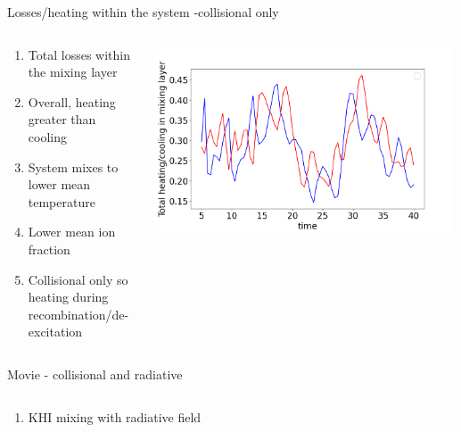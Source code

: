 \documentclass[10pt,aspectratio=169,usenames,dvipsnames]{beamer}
\begin{document}
\begin{frame}{Losses/heating within the system -collisional only}
\begin{columns}
\begin{column}{0.5\textwidth}
\begin{enumerate}
\item Total losses within the mixing layer
\item Overall, heating greater than cooling
\item System mixes to lower mean temperature 
\item Lower mean ion fraction
\item Collisional only so heating during recombination/de-excitation
\end{enumerate}
\end{column}
\begin{column}{0.5\textwidth}
\includegraphics[width=0.99\textwidth]{2023Mixing/Figures/KHInlev_losstimeplot.png}
\end{column}
\end{columns}
\end{frame}

\begin{frame}{Movie - collisional and radiative}
\begin{columns}
\begin{column}{0.5\textwidth}
\begin{enumerate}
\item KHI mixing with radiative field
\end{enumerate}
\end{column}
\begin{column}{0.5\textwidth}

\end{column}
\end{columns}
\end{frame}
\end{document}
